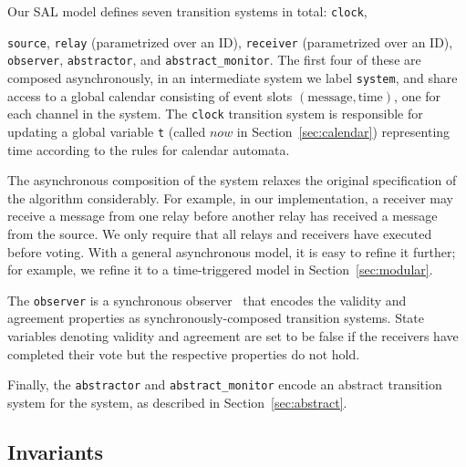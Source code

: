 \documentclass{llncs/llncs}
\begin{document}
Our SAL model defines seven transition systems in total: \texttt{clock}, {\texttt{source}, \texttt{relay} (parametrized over an ID), \texttt{receiver} (parametrized over an ID), \texttt{observer}, \texttt{abstractor}, and \texttt{abstract\_monitor}. The first four of these are composed asynchronously, in an intermediate system we label \texttt{system}, and share access to a global calendar consisting of event slots $(\text{message}, \text{time})$, one for each channel in the system. The \texttt{clock} transition system is responsible for updating a global variable \texttt{t} (called $now$ in Section~\ref{sec:calendar}) representing time according to the rules for calendar automata.

The asynchronous composition of the system relaxes the original specification of the algorithm considerably. For example, in our implementation, a receiver may receive a message from one relay before another relay has received a message from the source. We only require that all relays and receivers have executed before voting. With a general asynchronous model, it is easy to refine it further; for example, we refine it to a time-triggered model in Section~\ref{sec:modular}.

The \texttt{observer} is a synchronous observer~\cite{Rushby:SAS14} that encodes the validity and agreement properties as synchronously-composed transition systems. State variables denoting validity and agreement are set to be false if the receivers have completed their vote but the respective properties do not hold.

Finally, the \texttt{abstractor} and \texttt{abstract\_monitor} encode an abstract transition system for the system, as described in Section~\ref{sec:abstract}.


\subsection{Invariants}\label{sec:invariants}

\begin{figure}
  \centering
  \footnotesize
\end{figure}}
\end{document}
